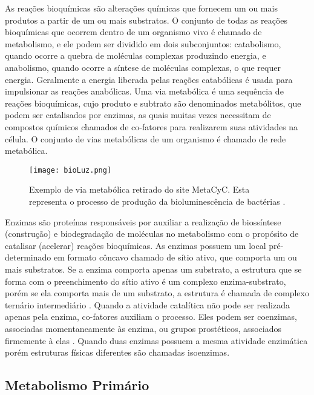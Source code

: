 
\indent As reações bioquímicas são alterações químicas que fornecem um ou mais produtos a partir de um ou mais substratos. O conjunto de todas as reações bioquímicas que ocorrem dentro de um organismo vivo é chamado de metabolismo, e ele podem ser dividido em dois subconjuntos: catabolismo, quando ocorre a quebra de moléculas complexas produzindo energia, e anabolismo, quando ocorre a síntese de moléculas complexas, o que requer energia. Geralmente a energia liberada pelas reações catabólicas é usada para impulsionar as reações anabólicas\cite{carterClass}. Uma via metabólica é uma sequência de reações bioquímicas, cujo produto e subtrato são denominados metabólitos, que podem ser catalisados por enzimas, as quais muitas vezes necessitam de compostos químicos chamados de co-fatores para realizarem suas atividades na célula. O conjunto de vias metabólicas de um organismo é chamado de rede metabólica.

\begin{figure}[h]
    \centering
    \texttt{[image: bioLuz.png]}
    \caption{Exemplo de via metabólica retirado do site MetaCyC. Esta representa o processo de produção da bioluminescência de bactérias \cite{examplePathway}. }
    \label{fig:EstruturasDoDNA}
\end{figure} 

\indent Enzimas são proteínas responsáveis por auxiliar a realização de biossíntese (construção) e biodegradação de moléculas no metabolismo com o propósito de catalisar (acelerar) reações bioquímicas. As enzimas possuem um local pré-determinado em formato côncavo chamado de sítio ativo, que comporta um ou mais substratos. Se a enzima comporta apenas um substrato, a estrutura que se forma com o preenchimento do sítio ativo é um complexo enzima-substrato, porém se ela comporta mais de um substrato, a estrutura é chamada de complexo ternário intermediário \cite{Cap2schomburg}. Quando a atividade catalítica não pode ser realizada apenas pela enzima, co-fatores auxiliam o processo. Eles podem ser coenzimas, associadas momentaneamente às enzima, ou grupos prostéticos, associados firmemente à elas \cite{Cap2schomburg}. Quando duas enzimas possuem a mesma atividade enzimática porém estruturas físicas diferentes são chamadas isoenzimas\cite{Cap2schomburg}.


\subsection{Metabolismo Primário}


